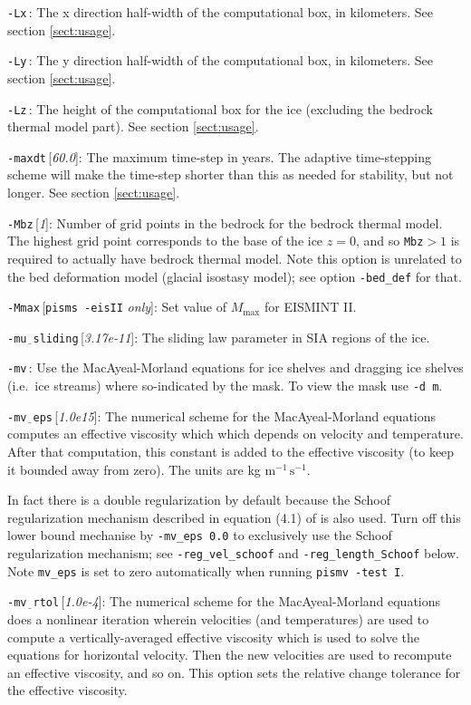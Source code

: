 \documentclass[11pt,final]{amsart}
\renewcommand{\t}[1]{\texttt{#1}}
\newcommand{\rawopt}[1]{\vspace{1mm}\noindent \Large\texttt{-#1}\normalsize}
\newcommand{\opt}[1]{\rawopt{#1}\,:\quad}
\newcommand{\optdef}[2]{\rawopt{#1}\,[\textsl{#2}]:\quad}
\newcommand{\optrestrict}[2]{\rawopt{#1}\,[\texttt{#2} \textsl{only}]:\quad}
\newcommand{\und}{$\underline{\,\,\,}$}
\begin{document}
\opt{Lx}  The x direction half-width of the computational box, in kilometers.  See section \ref{sect:usage}.

\opt{Ly}  The y direction half-width of the computational box, in kilometers.  See section \ref{sect:usage}.

\opt{Lz}  The height of the computational box for the ice (excluding the bedrock thermal model part).  See section \ref{sect:usage}.

\optdef{maxdt}{60.0}  The maximum time-step in years.  The adaptive time-stepping scheme will make the time-step shorter than this as needed for stability, but not longer.  See section \ref{sect:usage}.

\optdef{Mbz}{1}  Number of grid points in the bedrock for the bedrock thermal model.  The highest grid point corresponds to the base of the ice $z=0$, and so \t{Mbz}$>1$ is required to actually have bedrock thermal model.  Note this option is unrelated to the bed deformation model (glacial isostasy model); see option \verb|-bed_def| for that.

\optrestrict{Mmax}{pisms -eisII}  Set value of $M_{\text{max}}$ for EISMINT II.

\optdef{mu\und sliding}{3.17e-11}  The sliding law parameter in SIA regions of the ice.

\opt{mv}  Use the MacAyeal-Morland equations  \cite{MacAyeal} for ice shelves and dragging ice shelves (i.e.~ice streams) where so-indicated by the mask.  To view the mask use \verb|-d m|.

\optdef{mv\und eps}{1.0e15}  The numerical scheme for the MacAyeal-Morland equations computes an effective viscosity which which depends on velocity and temperature.  After that computation, this constant is added to the effective viscosity (to keep it bounded away from zero).  The units are kg $\text{m}^{-1}\,\text{s}^{-1}$. 

In fact there is a double regularization by default because the Schoof regularization mechanism described in equation (4.1) of \cite{SchoofStream} is also used.  Turn off this lower bound mechanise by \verb|-mv_eps 0.0| to exclusively use the Schoof regularization mechanism; see \verb|-reg_vel_schoof| and \verb|-reg_length_Schoof| below.  Note \verb|mv_eps| is set to zero automatically when running \verb|pismv -test I|.

\optdef{mv\und rtol}{1.0e-4}  The numerical scheme for the MacAyeal-Morland equations does a nonlinear iteration wherein velocities (and temperatures) are used to compute a vertically-averaged effective viscosity which is used to solve the equations for horizontal velocity.  Then the new velocities are used to recompute an effective viscosity, and so on.  This option sets the relative change tolerance for the effective viscosity.
\end{document}
